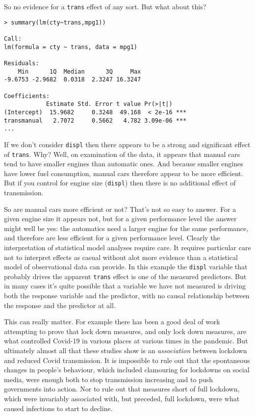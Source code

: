 \documentclass[10pt] {article}
\theoremstyle{definition}
\begin{document}
So no evidence for a {\tt trans} effect of any sort. But what about this?
{\small
\begin{verbatim}
> summary(lm(cty~trans,mpg1))

Call:
lm(formula = cty ~ trans, data = mpg1)

Residuals:
    Min      1Q  Median      3Q     Max 
-9.6753 -2.9682  0.0318  2.3247 16.3247 

Coefficients:
            Estimate Std. Error t value Pr(>|t|)    
(Intercept)  15.9682     0.3248  49.168  < 2e-16 ***
transmanual   2.7072     0.5662   4.782 3.09e-06 ***
...
\end{verbatim}}
If we don't consider {\tt displ} then there appears to be a strong and significant effect of {\tt trans}. Why? Well, on examination of the data, it appears that manual cars tend to have smaller engines than automatic ones. And because smaller engines have lower fuel consumption, manual cars therefore appear to be more efficient. But if you control for engine size ({\tt displ}) then there is no additional effect of transmission. 

So are manual cars more efficient or not? That's not so easy to answer. For a given engine size it appears not, but for a given performance level the answer might well be yes: the automatics need a larger engine for the same performance, and therefore are less efficient for a given performance level. Clearly the interpretation of statistical model analyses require care. It requires particular care not to interpret effects as casual without alot more evidence than a statistical model of observational data can provide. In this example the {\tt displ} variable that probably drives the apparent {\tt trans} effect is one of the measured predictors. But in many cases it's quite possible that a variable we have not measured is driving both the response variable and the predictor, with no causal relationship between the response and the predictor at all.   

This can really matter. For example there has been a good deal of work attempting to prove that lock down measures, and only lock down measures, are what controlled Covid-19 in various places at various times in the pandemic. But ultimately almost all that these studies show is an {\em association} between lockdown and reduced Covid transmission. It is impossible to rule out that the spontaneous changes in people's behaviour, which included clamouring for lockdowns on social media, were enough both to stop transmission increasing and to push governments into action. Nor to rule out that measures short of full lockdown, which were invariably associated with, but preceded, full lockdown, were what caused infections to start to decline.        
\end{document}
